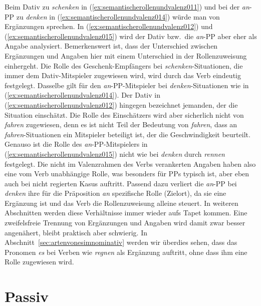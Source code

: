 Beim Dativ zu \textit{schenken} in (\ref{ex:semantischerollenundvalenz011}) und bei der \textit{an}-PP zu \textit{denken} in (\ref{ex:semantischerollenundvalenz014}) würde man von Ergänzungen sprechen.
In (\ref{ex:semantischerollenundvalenz012}) und (\ref{ex:semantischerollenundvalenz015}) wird der Dativ bzw.\ die \textit{an}-PP aber eher als Angabe analysiert.
Bemerkenswert ist, dass der Unterschied zwischen Ergänzungen und Angaben hier mit einem Unterschied in der Rollenzuweisung einhergeht.
Die Rolle des Geschenk-Empfängers bei \textit{schenken}-Situationen, die immer dem Dativ-Mitspieler zugewiesen wird, wird durch das Verb eindeutig festgelegt.
Dasselbe gilt für den \textit{an}-PP-Mitspieler bei \textit{denken}-Situationen wie in (\ref{ex:semantischerollenundvalenz014}).
Der Dativ in (\ref{ex:semantischerollenundvalenz012}) hingegen bezeichnet jemanden, der die Situation einschätzt.
Die Rolle des Einschätzers wird aber sicherlich nicht von \textit{fahren} zugewiesen, denn es ist nicht Teil der Bedeutung von \textit{fahren}, dass an \textit{fahren}-Situationen ein Mitspieler beteiligt ist, der die Geschwindigkeit beurteilt.
Genauso ist die Rolle des \textit{an}-PP-Mitspielers in (\ref{ex:semantischerollenundvalenz015}) nicht wie bei \textit{denken} durch \textit{rennen} festgelegt.
Die nicht im Valenzrahmen des Verbs verankerten Angaben haben also eine vom Verb unabhängige Rolle, was besonders für PPs typisch ist, aber eben auch bei nicht regierten Kasus auftritt.
Passend dazu verliert die \textit{an}-PP bei \textit{denken} ihre für die Präposition \textit{an} spezifische Rolle (Zielort), da sie eine Ergänzung ist und das Verb die Rollenzuweisung alleine steuert.
In weiteren Abschnitten werden diese Verhältnisse immer wieder aufs Tapet kommen.
Eine zweifelsfreie Trennung von Ergänzungen und Angaben wird damit zwar besser angenähert, bleibt praktisch aber schwierig.
In Abschnitt~\ref{sec:artenvonesimnominativ} werden wir überdies sehen, dass das Pronomen \textit{es} bei Verben wie \textit{regnen} als Ergänzung auftritt, ohne dass ihm eine Rolle zugewiesen wird.


\section{Passiv}
\label{sec:passiv}

